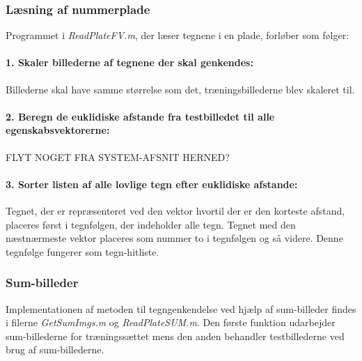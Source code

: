 

\subsubsection*{Læsning af nummerplade}

Programmet i \textit{ReadPlateFV.m}, der læser tegnene i en plade, forløber som følger:

\paragraph{1. Skaler billederne af tegnene der skal genkendes:} Billederne skal have samme størrelse som det, træningsbillederne blev skaleret til.

\paragraph{2. Beregn de euklidiske afstande fra testbilledet til alle egenskabsvektorerne:} FLYT NOGET FRA SYSTEM-AFSNIT HERNED?

\paragraph{3. Sorter listen af alle lovlige tegn efter euklidiske afstande:} Tegnet, der er repræsenteret ved den vektor hvortil der er den korteste afstand, placeres først i tegnfølgen, der indeholder alle tegn. Tegnet med den næstnærmeste vektor placeres som nummer to i tegnfølgen og så videre. Denne tegnfølge fungerer som tegn-hitliste.

\subsubsection{Sum-billeder}

Implementationen af metoden til tegngenkendelse ved hjælp af sum-billeder findes i filerne \textit{GetSumImgs.m} og \textit{ReadPlateSUM.m}. Den første funktion udarbejder sum-billederne for træningssættet mens den anden behandler testbillederne ved brug af sum-billederne.

